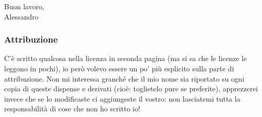 \begin{flushright}
	Buon lavoro,\\
	Alessandro
\end{flushright}

\subsubsection*{Attribuzione}
C'è scritto qualcosa nella licenza in seconda pagina (ma si sa che le licenze le leggono in pochi), io però volevo essere un po' più esplicito sulla parte di attribuzione. Non mi interessa granché che il mio nome sia riportato su ogni copia di queste dispense e derivati (cioè: toglietelo pure se preferite), apprezzerei invece che se lo modificaste ci aggiungeste il vostro: non lasciatemi tutta la responsabilità di cose che non ho scritto io!

\makeatletter\@openrighttrue\makeatother